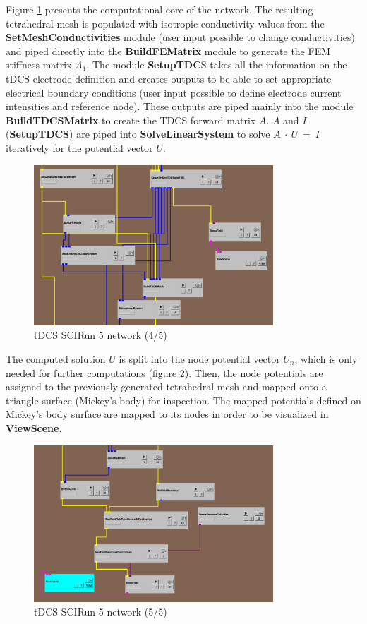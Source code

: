 \documentclass[fleqn,11pt,openany]{book}
\begin{document}
Figure \ref{fig:tdcs4} presents the computational core of the network. The resulting tetrahedral mesh is populated with
isotropic conductivity values from the \textbf{SetMeshConductivities} module (user input possible to change conductivities) and piped directly into the \textbf{BuildFEMatrix} module
to generate the FEM stiffness matrix $A_{1}$. The module \textbf{SetupTDC}S takes all the information on the tDCS electrode definition and creates
outputs to be able to set appropriate electrical boundary conditions (user input possible to define electrode current intensities and reference node).
These outputs are piped mainly into the module \textbf{BuildTDCSMatrix} to create the TDCS forward matrix $A$. $A$ and $I$ (\textbf{SetupTDCS}) are piped into \textbf{SolveLinearSystem}
to solve $A\ \cdot\ U\ =\ I$ iteratively for the potential vector $U$.

\begin{figure}[!h]
\centering
\includegraphics[width=0.8\textwidth]{BrainStimulation_figures/tdcs_4.png}
\caption{ tDCS SCIRun 5 network (4/5)}
\label{fig:tdcs4}
\end{figure}


The computed solution $U$ is split into the node potential vector $U_n$, which is only needed for further computations (figure \ref{fig:tdcs5}).
Then, the node potentials are assigned to the previously generated tetrahedral mesh and mapped onto a triangle surface (Mickey's body) for inspection.
The mapped potentials defined on Mickey's body surface are mapped to its nodes in order to be visualized in \textbf{ViewScene}.

 \begin{figure}[!h]
\centering
\includegraphics[width=0.8\textwidth]{BrainStimulation_figures/tdcs_5.png}
\caption{ tDCS SCIRun 5 network (5/5)}
\label{fig:tdcs5}
\end{figure}
\end{document}
